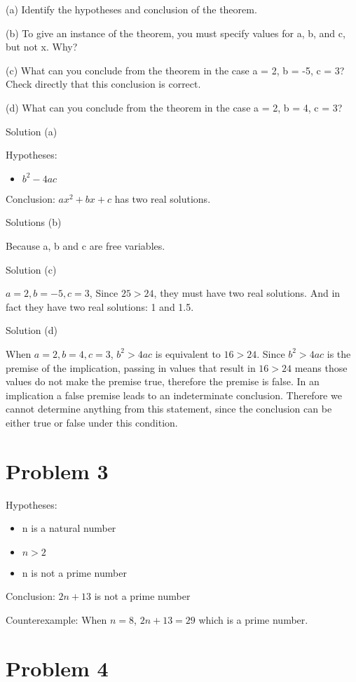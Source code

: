 \documentclass{article}
\begin{document}
(a) Identify the hypotheses and conclusion of the theorem.

(b) To give an instance of the theorem, you must specify values for a, b,
and c, but not x. Why?

(c) What can you conclude from the theorem in the case a = 2, b = -5,
c = 3? Check directly that this conclusion is correct.

(d) What can you conclude from the theorem in the case a = 2, b = 4, c
= 3?

Solution (a)

Hypotheses:
\begin{itemize}
\item $b^2 - 4ac$
\end{itemize}

Conclusion: $ax^2 + bx + c$ has two real solutions.

Solutions (b)

Because a, b and c are free variables.

Solution (c)

$a = 2, b = -5, c=3$, Since $25 > 24$, they must have two real
solutions. And in fact they have two real solutions: 1 and 1.5.

Solution (d)

When $a =2, b=4, c=3$, $b^2 > 4ac$ is equivalent to $16 > 24$.
Since $b^2 > 4ac$ is the premise of the implication, passing in values
that result in $16 > 24$ means those values do not make the premise
true, therefore the premise is false. In an implication a false premise
leads to an indeterminate conclusion. Therefore we cannot determine
anything from this statement, since the conclusion can be either
true or false under this condition.


\section{Problem 3}

Hypotheses:
\begin{itemize}
\item n is a natural number
\item $n > 2$
\item n is not a prime number
\end{itemize}

Conclusion: $2n + 13$ is not a prime number

Counterexample: When $n = 8$, $2n + 13 = 29$ which is a prime number.

\section{Problem 4}
\end{document}
